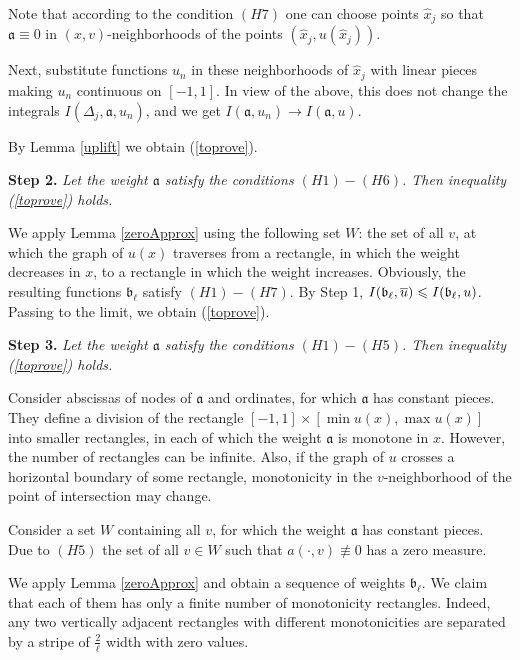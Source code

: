 Note that according to the condition $(H7)$ one can choose points $\hat{x}_j$ so
that $\mathfrak a \equiv 0$ in $(x, v)$-neighborhoods of the points $(\hat{x}_j, u(\hat{x}_j))$.

Next, substitute functions $u_n$ in these neighborhoods of $\hat{x}_j$ with linear pieces
making $u_n$ continuous on $[-1, 1]$.
In view of the above, this does not change the integrals $I(\Delta_j, \mathfrak a, u_n)$,
and we get $I(\mathfrak a, u_n) \to I(\mathfrak a, u)$.

By Lemma \ref{uplift} we obtain (\ref{toprove}).

\bigskip

\textbf{Step 2.} \textit{Let the weight $\mathfrak a$ satisfy the conditions $(H1)-(H6)$.
Then inequality (\ref{toprove}) holds.}

We apply Lemma \ref{zeroApprox} using the following set $W$:
the set of all $v$, at which the graph of $u(x)$ traverses from a rectangle,
in which the weight decreases in $x$,
to a rectangle in which the weight increases.
Obviously, the resulting functions $\mathfrak b_{\ell}$ satisfy $(H1)-(H7)$.
By Step 1, $I(\mathfrak b_{\ell}, \mon{u}) \le I(\mathfrak b_{\ell}, u)$.
Passing to the limit, we obtain (\ref{toprove}).

\bigskip

\textbf{Step 3.} \textit{Let the weight $\mathfrak a$ satisfy the conditions $(H1)-(H5)$.
Then inequality (\ref{toprove}) holds.}

Consider abscissas of nodes of $\mathfrak a$
and ordinates, for which $\mathfrak a$ has constant pieces.
They define a division of the rectangle $[-1, 1] \times [\min u(x), \max u(x)]$
into smaller rectangles, in each of which the weight $\mathfrak a$ is monotone in $x$.
However, the number of rectangles can be infinite.
Also, if the graph of $u$ crosses a horizontal boundary of some rectangle,
monotonicity in the $v$-neighborhood of the point of intersection may change.

Consider a set $W$ containing all $v$, for which the weight $\mathfrak a$ has constant pieces.
Due to $(H5)$ the set of all  $v \in W$ such that $a(\cdot, v) \not\equiv 0$ has a zero measure.

We apply Lemma \ref{zeroApprox} and obtain a sequence of weights $\mathfrak b_{\ell}$.
We claim that each of them has only a finite number of monotonicity rectangles.
Indeed, any two vertically adjacent rectangles with different monotonicities
are separated by a stripe of $\frac{2}{\ell}$ width with zero values.

